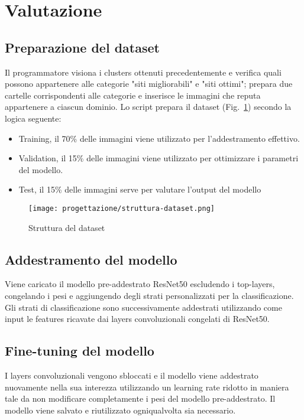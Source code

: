 
\newpage

\section{Valutazione}

\subsection{Preparazione del dataset}
Il programmatore visiona i clusters ottenuti precedentemente e verifica quali possono appartenere alle categorie "siti migliorabili" e "siti ottimi"; prepara due cartelle corrispondenti alle categorie e inserisce le immagini che reputa appartenere a ciascun dominio.
Lo script prepara il dataset (Fig.~\ref{fig:struttura-dataset}) secondo la logica seguente:
\begin{itemize}
  \item Training, il 70\% delle immagini viene utilizzato per l'addestramento effettivo.
  \item Validation, il 15\% delle immagini viene utilizzato per ottimizzare i parametri del modello.
  \item Test, il 15\% delle immagini serve per valutare l'output del modello
\end{itemize}

\begin{figure}[!h] 
  \centering 
  \texttt{[image: progettazione/struttura-dataset.png]} 
  \caption{Struttura del dataset}
  \label{fig:struttura-dataset}
\end{figure}

\subsection{Addestramento del modello}
Viene caricato il modello pre-addestrato ResNet50 escludendo i top-layers, congelando i pesi e aggiungendo degli strati personalizzati per la classificazione.
Gli strati di classificazione sono successivamente addestrati utilizzando come input le features ricavate dai layers convoluzionali congelati di ResNet50. 

\subsection{Fine-tuning del modello}
I layers convoluzionali vengono sbloccati e il modello viene addestrato nuovamente nella sua interezza utilizzando un learning rate ridotto in maniera tale da non modificare completamente i pesi del modello pre-addestrato.
Il modello viene salvato e riutilizzato ogniqualvolta sia necessario.

